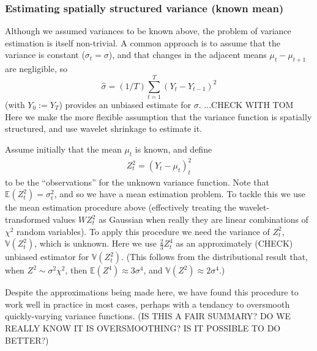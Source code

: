 \documentclass[12pt]{article}
\newcommand{\s}{\sigma}
\begin{document}
\subsubsection{Estimating spatially structured variance (known mean)}

Although we assumed variances to be known above, the problem of variance estimation is itself non-trivial. 
A common approach is to assume that the variance is constant ($\sigma_t=\sigma$), and that changes in the adjacent means $\mu_t-\mu_{t+1}$ are negligible, so 
\begin{equation} \label{eq:constvar}
\hat{\sigma} = (1/T) \sum_{t=1}^{T} (Y_t-Y_{t-1})^2
\end{equation}
(with $Y_0:=Y_T$) provides an unbiased estimate for $\sigma$. ...CHECK WITH TOM
Here we make the more flexible assumption that the variance function is spatially structured, and use wavelet shrinkage to estimate it. 

Assume initially that the mean $\mu_t$ is known, and define
\begin{eqnarray}\label{eq:varobs1}
Z_t^2=(Y_t-\mu_t)^2_t
\end{eqnarray}
to be the ``observations'' for the unknown variance function. Note that $\mathbb{E}(Z_t^2)=\s_t^2$, and so
we have a mean estimation problem. To tackle this we use the mean estimation procedure above (effectively treating the wavelet-transformed values $WZ_t^2$ as Gaussian when really they are linear combinations of $\chi^2$ random variables). To apply this procedure we need the variance
of $Z_t^2$, $\mathbb{V}(Z_t^2)$, which is unknown.
Here we use $\frac{2}{3}Z_t^4$ as an approximately (CHECK) 
unbiased estimator for $\mathbb{V}(Z_t^2)$. (This follows from the distributional result that, when $Z^2 \sim \s^2 \chi^2$, then $\mathbb{E}(Z^4)\approx 3\s^4$, and $\mathbb{V}(Z^2)\approx 2\s^4$.)

Despite the approximations being made here, we have found this procedure to work well in practice in most cases,
perhaps with a tendancy to oversmooth quickly-varying variance functions. (IS THIS A FAIR SUMMARY? DO
WE REALLY KNOW IT IS OVERSMOOTHING? IS IT POSSIBLE TO DO BETTER?)
\end{document}
